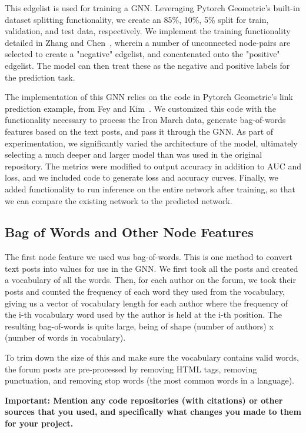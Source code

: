 \documentclass[10pt,twocolumn,letterpaper]{article}
\begin{document}
This edgelist is used for training a GNN. Leveraging Pytorch Geometric's built-in dataset splitting functionality, we create an 85\%, 10\%, 5\% split for train, validation, and test data, respectively. We implement the training functionality detailed in Zhang and Chen~\cite{SEAL}, wherein a number of unconnected node-pairs are selected to create a "negative" edgelist, and concatenated onto the "positive" edgelist. The model can then treat these as the negative and positive labels for the prediction task. 

The implementation of this GNN relies on the code in Pytorch Geometric's link prediction example, from Fey and Kim~\cite{pytorch-geometric}. We customized this code with the functionality necessary to process the Iron March data, generate bag-of-words features based on the text posts, and pass it through the GNN. As part of experimentation, we significantly varied the architecture of the model, ultimately selecting a much deeper and larger model than was used in the original repository. The metrics were modified to output accuracy in addition to AUC and loss, and we included code to generate loss and accuracy curves. Finally, we added functionality to run inference on the entire network after training, so that we can compare the existing network to the predicted network.

\subsection{Bag of Words and Other Node Features}

The first node feature we used was bag-of-words. This is one method to convert text posts into values for use in the GNN. We first took all the posts and created a vocabulary of all the words. Then, for each author on the forum, we took their posts and counted the frequency of each word they used from the vocabulary, giving us a vector of vocabulary length for each author where the frequency of the i-th vocabulary word used by the author is held at the i-th position. The resulting bag-of-words is quite large, being of shape (number of authors) x (number of words in vocabulary). 

To trim down the size of this and make sure the vocabulary contains valid words, the forum posts are pre-processed by removing HTML tags, removing punctuation, and removing stop words (the most common words in a language).

\textbf{Important: Mention any code repositories (with citations) or other sources that you used, and specifically what changes you made to them for your project. }
\end{document}

